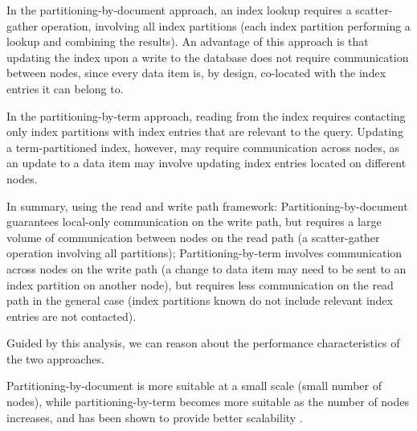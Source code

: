 In the partitioning-by-document approach, an index lookup requires a scatter-gather operation,
involving all index partitions (each index partition performing a lookup and combining the results).
An advantage of this approach is that updating the index upon a write to the database does not require
communication between nodes,
since every data item is, by design, co-located with the index entries it can belong to.

In the partitioning-by-term approach, reading from the index requires contacting only index partitions with index entries
that are relevant to the query.
Updating a term-partitioned index, however, may require communication across nodes,
as an update to a data item may involve updating index entries located on different nodes.

In summary, using the read and write path framework:
Partitioning-by-document guarantees local-only communication on the write path, but requires a large volume of
communication between nodes on the read path (a scatter-gather operation involving all partitions);
Partitioning-by-term involves communication across nodes on the write path (a change to data item may need to be sent to
an index partition on another node),
but requires less communication on the read path in the general case
(index partitions known do not include relevant index entries are not contacted).


Guided by this analysis, we can reason about the performance characteristics of the two approaches.

Partitioning-by-document is more suitable at a small scale (small number of nodes),
while partitioning-by-term becomes more suitable as the number of nodes increases,
and has been shown to provide better scalability \cite{kejriwal:slik}.

